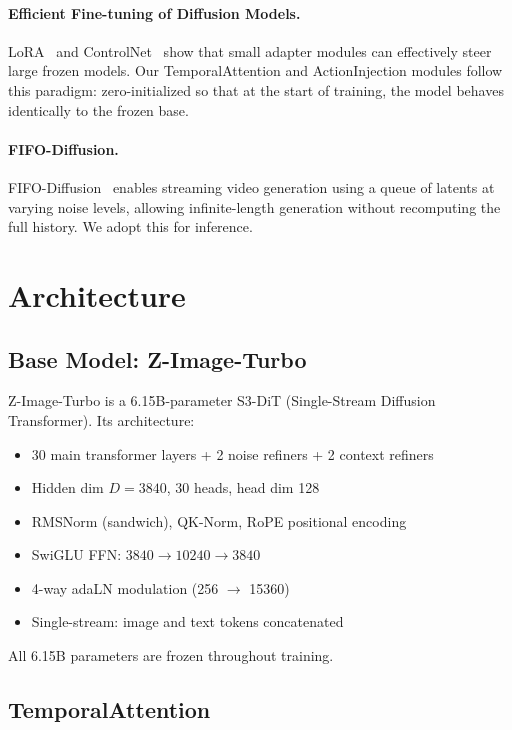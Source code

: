 \documentclass[10pt,twocolumn]{article}
\begin{document}
\paragraph{Efficient Fine-tuning of Diffusion Models.}
LoRA~\cite{hu2021lora} and ControlNet~\cite{zhang2023controlnet} show that small adapter modules can effectively steer large frozen models. Our TemporalAttention and ActionInjection modules follow this paradigm: zero-initialized so that at the start of training, the model behaves identically to the frozen base.

\paragraph{FIFO-Diffusion.}
FIFO-Diffusion~\cite{kim2024fifo} enables streaming video generation using a queue of latents at varying noise levels, allowing infinite-length generation without recomputing the full history. We adopt this for inference.

\section{Architecture}

\subsection{Base Model: Z-Image-Turbo}

Z-Image-Turbo is a 6.15B-parameter S3-DiT (Single-Stream Diffusion Transformer). Its architecture:
\begin{itemize}
  \item 30 main transformer layers + 2 noise refiners + 2 context refiners
  \item Hidden dim $D=3840$, 30 heads, head dim 128
  \item RMSNorm (sandwich), QK-Norm, RoPE positional encoding
  \item SwiGLU FFN: $3840 \to 10240 \to 3840$
  \item 4-way adaLN modulation (256 $\to$ 15360)
  \item Single-stream: image and text tokens concatenated
\end{itemize}

All 6.15B parameters are frozen throughout training.

\subsection{TemporalAttention}
\end{document}

